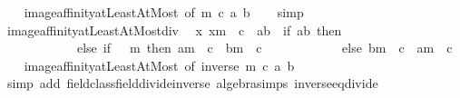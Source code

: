 \begin{isabellebody}
\ \ %
\endisadelimproof
%
\isatagproof
{}\isamarkupfalse%
\ image{\isacharunderscore}{\kern0pt}affinity{\isacharunderscore}{\kern0pt}atLeastAtMost\ {\isacharbrackleft}{\kern0pt}of\ m\ {\isachardoublequoteopen}{\isacharminus}{\kern0pt}c{\isachardoublequoteclose}\ a\ b{\isacharbrackright}{\kern0pt}\isanewline
\ \ \isamarkupfalse%
\ simp%
\endisatagproof
{\isafoldproof}%
%
\isadelimproof
\isanewline
%
\endisadelimproof
\isanewline
{}\isamarkupfalse%
\ image{\isacharunderscore}{\kern0pt}affinity{\isacharunderscore}{\kern0pt}atLeastAtMost{\isacharunderscore}{\kern0pt}div{\isacharcolon}{\kern0pt}\isanewline
\ \ {\isachardoublequoteopen}{\isacharparenleft}{\kern0pt}{\isacharparenleft}{\kern0pt}{\isasymlambda}x{\isachardot}{\kern0pt}\ x{\isacharslash}{\kern0pt}m\ {\isacharplus}{\kern0pt}\ c{\isacharparenright}{\kern0pt}\ {\isacharbackquote}{\kern0pt}\ {\isacharbraceleft}{\kern0pt}a{\isachardot}{\kern0pt}{\isachardot}{\kern0pt}b{\isacharbraceright}{\kern0pt}{\isacharparenright}{\kern0pt}\ {\isacharequal}{\kern0pt}\ {\isacharparenleft}{\kern0pt}if\ {\isacharbraceleft}{\kern0pt}a{\isachardot}{\kern0pt}{\isachardot}{\kern0pt}b{\isacharbraceright}{\kern0pt}{\isacharequal}{\kern0pt}{\isacharbraceleft}{\kern0pt}{\isacharbraceright}{\kern0pt}\ then\ {\isacharbraceleft}{\kern0pt}{\isacharbraceright}{\kern0pt}\isanewline
\ \ \ \ \ \ \ \ \ \ \ \ else\ if\ {}\ {\isasymle}\ m\ then\ {\isacharbraceleft}{\kern0pt}a{\isacharslash}{\kern0pt}m\ {\isacharplus}{\kern0pt}\ c\ {\isachardot}{\kern0pt}{\isachardot}{\kern0pt}\ b{\isacharslash}{\kern0pt}m\ {\isacharplus}{\kern0pt}\ c{\isacharbraceright}{\kern0pt}\isanewline
\ \ \ \ \ \ \ \ \ \ \ \ else\ {\isacharbraceleft}{\kern0pt}b{\isacharslash}{\kern0pt}m\ {\isacharplus}{\kern0pt}\ c\ {\isachardot}{\kern0pt}{\isachardot}{\kern0pt}\ a{\isacharslash}{\kern0pt}m\ {\isacharplus}{\kern0pt}\ c{\isacharbraceright}{\kern0pt}{\isacharparenright}{\kern0pt}{\isachardoublequoteclose}\isanewline
%
\isadelimproof
\ \ %
\endisadelimproof
%
\isatagproof
{}\isamarkupfalse%
\ image{\isacharunderscore}{\kern0pt}affinity{\isacharunderscore}{\kern0pt}atLeastAtMost\ {\isacharbrackleft}{\kern0pt}of\ {\isachardoublequoteopen}inverse\ m{\isachardoublequoteclose}\ c\ a\ b{\isacharbrackright}{\kern0pt}\isanewline
\ \ \isamarkupfalse%
\ {\isacharparenleft}{\kern0pt}simp\ add{\isacharcolon}{\kern0pt}\ field{\isacharunderscore}{\kern0pt}class{\isachardot}{\kern0pt}field{\isacharunderscore}{\kern0pt}divide{\isacharunderscore}{\kern0pt}inverse\ algebra{\isacharunderscore}{\kern0pt}simps\ inverse{\isacharunderscore}{\kern0pt}eq{\isacharunderscore}{\kern0pt}divide{\isacharparenright}{\kern0pt}%

\end{isabellebody}
